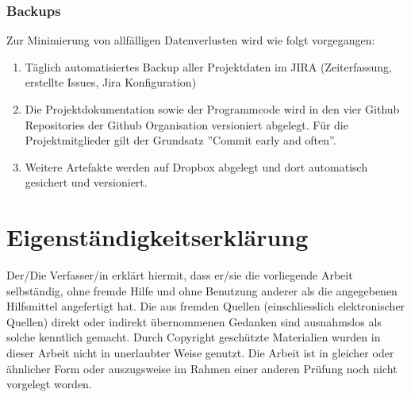 \documentclass[11pt,a4paper,english,oneside]{book}
\numberwithin{equation}{chapter}
\begin{document}
	\subsection{Backups}
		\label{sec:backup}
		Zur Minimierung von allfälligen Datenverlusten wird wie folgt vorgegangen:
	
	\begin{enumerate}
		\item Täglich automatisiertes Backup aller Projektdaten im JIRA \cite{jira} (Zeiterfassung, erstellte Issues, Jira Konfiguration)
		\item Die Projektdokumentation sowie der Programmcode wird in den vier Github Repositories der Github Organisation \cite{github} versioniert abgelegt. Für die Projektmitglieder gilt der Grundsatz ''Commit early and often''.
		\item Weitere Artefakte werden auf Dropbox \cite{dropbox} abgelegt und dort automatisch gesichert und versioniert.
	\end{enumerate}
	
	
	\newpage
	
	\appendix
	\noappendicestocpagenum
	\addappheadtotoc
	\appendixpage
	
	\printglossary
	\glsaddall
	
	\printbibliography[heading=bibintoc]
	
	{
		\hypersetup{linkcolor=black}
		\listoffigures
	}
	
	{
		\hypersetup{linkcolor=black}
		\listoftables
	}
	
	
	
	\chapter{Eigenständigkeitserklärung}
	Der/Die Verfasser/in erklärt hiermit, dass er/sie die vorliegende Arbeit selbständig, ohne fremde Hilfe und ohne Benutzung anderer als die angegebenen Hilfsmittel angefertigt hat. Die aus fremden Quellen (einschliesslich elektronischer Quellen) direkt oder indirekt übernommenen Gedanken sind ausnahmslos als solche kenntlich gemacht. Durch Copyright geschützte Materialien wurden in dieser Arbeit nicht in unerlaubter Weise genutzt. Die Arbeit ist in gleicher oder ähnlicher Form oder auszugsweise im Rahmen einer anderen Prüfung noch nicht vorgelegt worden.\\[2cm]
	 \hfill {}
	\hfill \\[2cm]
	 \hfill {}
	
\end{document}
